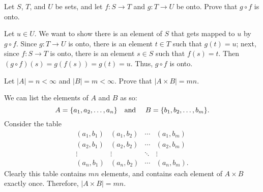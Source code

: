 \begin{exercise}[ID=1F]
Let $S$, $T$, and $U$ be sets, and let $f: S\to T$ and $g: T\to U$ be onto.  Prove that $g \circ f$ is onto.
\end{exercise}

\begin{solution}[print=true]
Let $u\in U$. We want to show there is an element of $S$ that gets mapped to $u$ by $g\circ f$. Since $g:T\to U$ is onto, there is an element $t\in T$ such that $g(t)=u$; next, since $f:S\to T$ is onto, there is an element $s\in S$ such that $f(s)=t$.  Then $(g\circ f)(s)=g(f(s))=g(t)=u$.  Thus, $g\circ f$ is onto.
\end{solution}

\begin{exercise}Let $|A|=n<\infty$ and $|B|=m< \infty$. Prove that $|A\times B|=mn$.
\end{exercise}

\begin{solution}[print=true]
We can list the elements of $A$ and $B$ as so: $$A=\{a_1,a_2,\ldots, a_n\} \mbox{\quad and \quad}B=\{b_1,b_2,\ldots, b_m\}.$$
Consider the table
$$\begin{array}{cccc}
      (a_1,b_1) & (a_1,b_2) & \cdots & (a_1,b_m) \\
      (a_2,b_1) & (a_2,b_2) & \cdots & (a_2,b_m)\\
      \vdots & \vdots  & \ddots & \vdots\\
      (a_n,b_1) & (a_n,b_2) & \cdots &  (a_n,b_m).
    \end{array}$$
Clearly this table contains $mn$ elements, and contains each element of $A\times B$ exactly once.  Therefore, $|A\times B|=mn$.

\end{solution} 